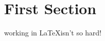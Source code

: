 \documentclass{article}
\begin{document}


\section*{First Section}
working in \LaTeX isn't so hard!
\end{document}
